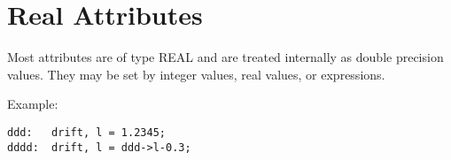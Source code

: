 
\section{Real Attributes}
\label{sec:real}

Most attributes are of type REAL and are treated internally as double
precision values. They may be set by integer values, real values,  or
expressions. 

Example:  
\begin{verbatim}
ddd:   drift, l = 1.2345;
dddd:  drift, l = ddd->l-0.3;
\end{verbatim}

